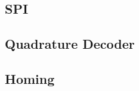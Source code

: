 \documentclass[../../main]{subfiles}
\begin{document}
\subsection{SPI}%
\label{sub:spi}



\label{sec:controller_design}





\subsection{Quadrature Decoder}%
\label{sub:quadraturdecoder}


\subsection{Homing}
\label{sub:homing}

\end{document}
